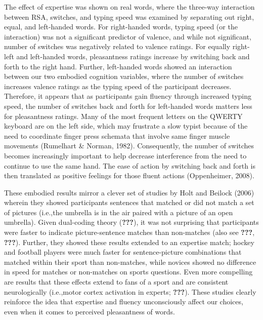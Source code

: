 \documentclass[english,man]{apa6}
\theoremstyle{definition}
\theoremstyle{definition}
\theoremstyle{definition}
\theoremstyle{remark}
\begin{document}
The effect of expertise was shown on real words, where the three-way
interaction between RSA, switches, and typing speed was examined by
separating out right, equal, and left-handed words. For right-handed
words, typing speed (or the interaction) was not a significant predictor
of valence, and while not significant, number of switches was negatively
related to valence ratings. For equally right-left and left-handed
words, pleasantness ratings increase by switching back and forth to the
right hand. Further, left-handed words showed an interaction between our
two embodied cognition variables, where the number of switches increases
valence ratings as the typing speed of the participant decreases.
Therefore, it appears that as participants gain fluency through
increased typing speed, the number of switches back and forth for
left-handed words matters less for pleasantness ratings. Many of the
most frequent letters on the QWERTY keyboard are on the left side, which
may frustrate a slow typist because of the need to coordinate finger
press schemata that involve same finger muscle movements (Rumelhart \&
Norman, 1982). Consequently, the number of switches becomes increasingly
important to help decrease interference from the need to continue to use
the same hand. The ease of action by switching back and forth is then
translated as positive feelings for those fluent actions (Oppenheimer,
2008).

These embodied results mirror a clever set of studies by Holt and
Beilock (2006) wherein they showed participants sentences that matched
or did not match a set of pictures (i.e.,the umbrella is in the air
paired with a picture of an open umbrella). Given dual-coding theory
({\textbf{???}}), it was not surprising that participants were faster to
indicate picture-sentence matches than non-matches (also see
{\textbf{???}}, {\textbf{???}}). Further, they showed these results
extended to an expertise match; hockey and football players were much
faster for sentence-picture combinations that matched within their sport
than non-matches, while novices showed no difference in speed for
matches or non-matches on sports questions. Even more compelling are
results that these effects extend to fans of a sport and are consistent
neurologically (i.e.,motor cortex activation in experts;
{\textbf{???}}). These studies clearly reinforce the idea that expertise
and fluency unconsciously affect our choices, even when it comes to
perceived pleasantness of words.
\end{document}
